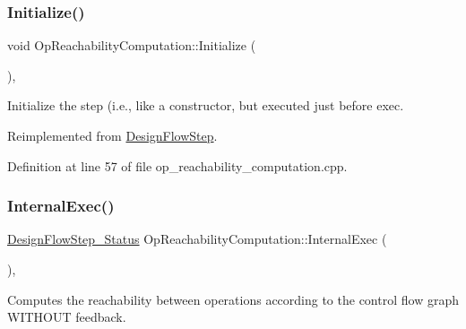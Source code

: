\mbox{\label{classOpReachabilityComputation_a64280ac1c3901738ef28fd4aaaece2d8}} 
\subsubsection{\texorpdfstring{Initialize()}{Initialize()}}
{\footnotesize\ttfamily void Op\+Reachability\+Computation\+::\+Initialize (\begin{DoxyParamCaption}{ }\end{DoxyParamCaption})\hspace{0.3cm}{\ttfamily [override]}, {\ttfamily [virtual]}}



Initialize the step (i.\+e., like a constructor, but executed just before exec. 



Reimplemented from \hyperlink{classDesignFlowStep_a44b50683382a094976e1d432a7784799}{Design\+Flow\+Step}.



Definition at line 57 of file op\+\_\+reachability\+\_\+computation.\+cpp.

\mbox{\label{classOpReachabilityComputation_ae8ff7b0bd968398819a90254ac482e5c}} 
\subsubsection{\texorpdfstring{Internal\+Exec()}{InternalExec()}}
{\footnotesize\ttfamily \hyperlink{design__flow__step_8hpp_afb1f0d73069c26076b8d31dbc8ebecdf}{Design\+Flow\+Step\+\_\+\+Status} Op\+Reachability\+Computation\+::\+Internal\+Exec (\begin{DoxyParamCaption}{ }\end{DoxyParamCaption})\hspace{0.3cm}{\ttfamily [override]}, {\ttfamily [virtual]}}



Computes the reachability between operations according to the control flow graph W\+I\+T\+H\+O\+UT feedback. 

